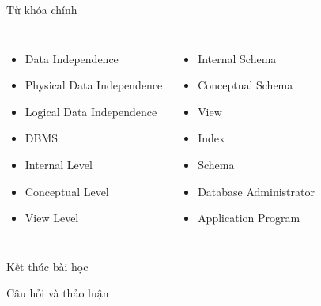 \documentclass[aspectratio=169,11pt]{beamer}
\begin{document}
\begin{frame}{Từ khóa chính}
\begin{columns}[T]
\begin{itemize}
  \item Data Independence
  \item Physical Data Independence
  \item Logical Data Independence
  \item DBMS
  \item Internal Level
  \item Conceptual Level
  \item View Level
\end{itemize}

\begin{itemize}
  \item Internal Schema
  \item Conceptual Schema
  \item View
  \item Index
  \item Schema
  \item Database Administrator
  \item Application Program
\end{itemize}
\end{columns}
\end{frame}

\begin{frame}{Kết thúc bài học}
\begin{center}
\Huge Câu hỏi và thảo luận
\end{center}
\end{frame}
\end{document}
